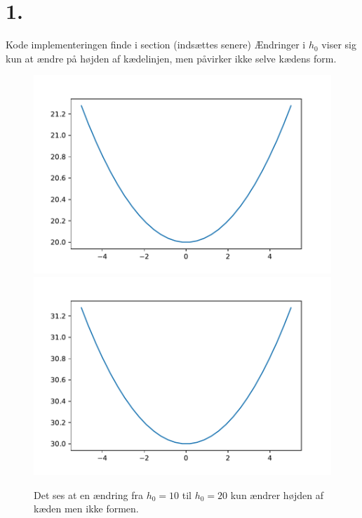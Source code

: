 \section*{1.}
Kode implementeringen finde i section (indsættes senere)
% 
Ændringer i $h_0$ viser sig kun at ændre på højden af kædelinjen, men påvirker ikke selve kædens form.

\begin{figure}[h!]
\includegraphics[scale=0.5]{code/fig1}
\includegraphics[scale=0.5]{code/fig2}
\caption{Det ses at en ændring fra $h_0=10$ til $h_0=20$ kun ændrer højden af kæden men ikke formen.}
\end{figure}



